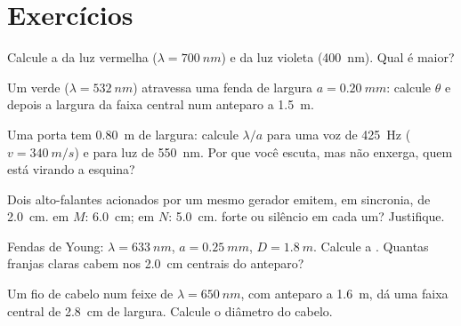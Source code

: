 \section{Exercícios}

\begin{exercise}[$\star$]\label{exo:g12:light-as-wave:1}
Calcule a  da luz vermelha ($\lambda = \qty{700}{nm}$) e da luz
violeta (\qty{400}{nm}). Qual é maior?
\end{exercise}

\begin{exercise}[$\star$]\label{exo:g12:light-as-wave:2}
Um  verde ($\lambda = \qty{532}{nm}$) atravessa uma fenda de largura
$a = \qty{0.20}{mm}$: calcule $\theta$ e depois a largura da faixa
central num anteparo a \qty{1.5}{m}.
\end{exercise}

\begin{exercise}[$\star$]\label{exo:g12:light-as-wave:3}
Uma porta tem \qty{0.80}{m} de largura: calcule $\lambda/a$ para uma voz
de \qty{425}{Hz} ($v = \qty{340}{m/s}$) e para luz de \qty{550}{nm}. Por
que você escuta, mas não enxerga, quem está virando a esquina?
\end{exercise}

\begin{exercise}[$\star$]\label{exo:g12:light-as-wave:4}
Dois alto-falantes acionados por um mesmo gerador emitem, em sincronia,
 de  \qty{2.0}{cm}.  em $M$:
\qty{6.0}{cm}; em $N$: \qty{5.0}{cm}.  forte ou silêncio em cada um?
Justifique.
\end{exercise}

\begin{exercise}[$\star$]\label{exo:g12:light-as-wave:5}
Fendas de Young: $\lambda = \qty{633}{nm}$, $a = \qty{0.25}{mm}$,
$D = \qty{1.8}{m}$. Calcule a . Quantas franjas claras cabem
nos \qty{2.0}{cm} centrais do anteparo?
\end{exercise}

\begin{exercise}[$\star\star$]\label{exo:g12:light-as-wave:6}
Um fio de cabelo num feixe de $\lambda = \qty{650}{nm}$, com anteparo a
\qty{1.6}{m}, dá uma faixa central de \qty{2.8}{cm} de largura. Calcule o
diâmetro do cabelo.
\end{exercise}

